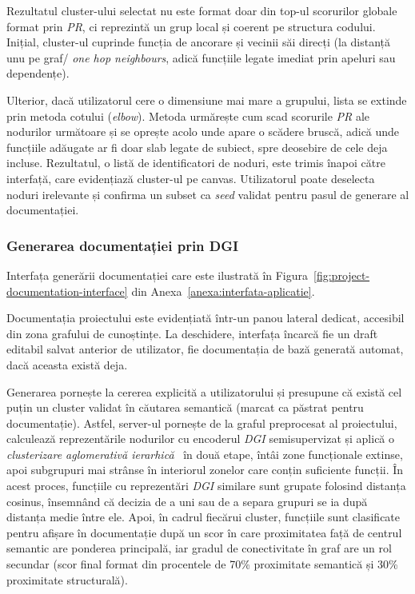 \documentclass[12pt]{article}
\numberwithin{equation}{section}
\numberwithin{figure}{section}
\numberwithin{table}{section}
\theoremstyle{definition}
\theoremstyle{plain}
\newcounter{anexa}
\begin{document}
Rezultatul cluster-ului selectat nu este format doar din top-ul scorurilor globale format prin \textit{PR}, ci reprezintă un grup local și coerent pe structura codului. Inițial, cluster-ul cuprinde funcția de ancorare și vecinii săi direcți (la distanță unu pe graf/ \textit{one hop neighbours}, adică funcțiile legate imediat prin apeluri sau dependențe).

Ulterior, dacă utilizatorul cere o dimensiune mai mare a grupului, lista se extinde prin metoda cotului (\textit{elbow}). Metoda urmărește cum scad scorurile \textit{PR} ale nodurilor următoare și se oprește acolo unde apare o scădere bruscă, adică unde funcțiile adăugate ar fi doar slab legate de subiect, spre deosebire de cele deja incluse. Rezultatul, o listă de identificatori de noduri, este trimis înapoi către interfață, care evidențiază cluster-ul pe canvas. Utilizatorul poate deselecta noduri irelevante și confirma un subset ca \textit{seed} validat pentru pasul de generare al documentației.

\subsubsection{Generarea documentației prin DGI}

Interfața generării documentației care este ilustrată în Figura~\ref{fig:project-documentation-interface} din Anexa~\ref{anexa:interfata-aplicatie}.

Documentația proiectului este evidențiată într-un panou lateral dedicat, accesibil din zona grafului de cunoștințe. La deschidere, interfața încarcă fie un draft editabil salvat anterior de utilizator, fie documentația de bază generată automat, dacă aceasta există deja.

Generarea pornește la cererea explicită a utilizatorului și presupune că există cel puțin un cluster validat în căutarea semantică (marcat ca păstrat pentru documentație). Astfel, server-ul pornește de la graful preprocesat al proiectului, calculează reprezentările nodurilor cu encoderul \textit{DGI} semisupervizat și aplică o \textit{clusterizare aglomerativă ierarhică}~\cite{ward1963hierarchical} în două etape, întâi zone funcționale extinse, apoi subgrupuri mai strânse în interiorul zonelor care conțin suficiente funcții. În acest proces, funcțiile cu reprezentări \textit{DGI} similare sunt grupate folosind distanța cosinus, însemnând că decizia de a uni sau de a separa grupuri se ia după distanța medie între ele. Apoi, în cadrul fiecărui cluster, funcțiile sunt clasificate pentru afișare în documentație după un scor în care proximitatea față de centrul semantic are ponderea principală, iar gradul de conectivitate în graf are un rol secundar (scor final format din procentele de 70\% proximitate semantică și 30\% proximitate structurală).
\end{document}
